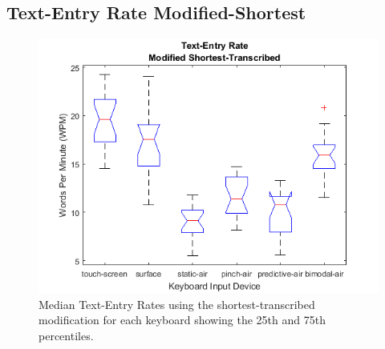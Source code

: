 \subsection{Text-Entry Rate Modified-Shortest}
\begin{figure}[h]
	\centering
	\includegraphics{fig_textentry_short_boxplot}
	\caption[Text-Entry Rates Boxplot for Modified-Shortest]{Median Text-Entry Rates using the shortest-transcribed modification for each keyboard showing the 25th and 75th percentiles.}
	\label{fig_textentry_short_boxplot}
\end{figure}

